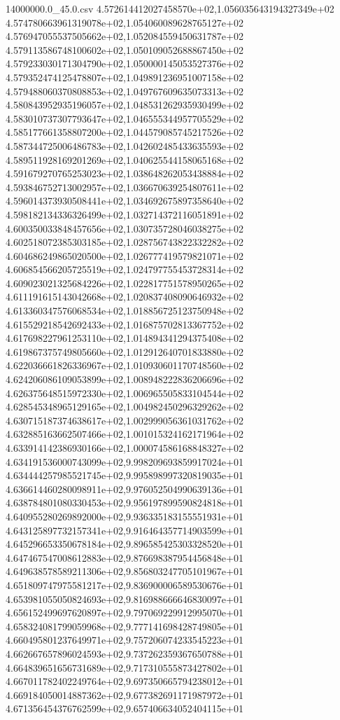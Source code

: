 \begin{filecontents*}{14000000.0_45.0.csv}
4.572614412027458570e+02,1.056035643194327349e+02
4.574780663961319078e+02,1.054060089628765127e+02
4.576947055537505662e+02,1.052084559450631787e+02
4.579113586748100602e+02,1.050109052688867450e+02
4.579233030171304790e+02,1.050000145053527376e+02
4.579352474125478807e+02,1.049891236951007158e+02
4.579488060370808853e+02,1.049767609635073313e+02
4.580843952935196057e+02,1.048531262935930499e+02
4.583010737307793647e+02,1.046555344957705529e+02
4.585177661358807200e+02,1.044579085745217526e+02
4.587344725006486783e+02,1.042602485433635593e+02
4.589511928169201269e+02,1.040625544158065168e+02
4.591679270765253023e+02,1.038648262053438884e+02
4.593846752713002957e+02,1.036670639254807611e+02
4.596014373930508441e+02,1.034692675897358640e+02
4.598182134336326499e+02,1.032714372116051891e+02
4.600350033848457656e+02,1.030735728046038275e+02
4.602518072385303185e+02,1.028756743822332282e+02
4.604686249865020500e+02,1.026777419579821071e+02
4.606854566205725519e+02,1.024797755453728314e+02
4.609023021325684226e+02,1.022817751578950265e+02
4.611191615143042668e+02,1.020837408090646932e+02
4.613360347576068534e+02,1.018856725123750948e+02
4.615529218542692433e+02,1.016875702813367752e+02
4.617698227961253110e+02,1.014894341294375408e+02
4.619867375749805660e+02,1.012912640701833880e+02
4.622036661826336967e+02,1.010930601170748560e+02
4.624206086109053899e+02,1.008948222836206696e+02
4.626375648515972330e+02,1.006965505833104544e+02
4.628545348965129165e+02,1.004982450296329262e+02
4.630715187374638617e+02,1.002999056361031762e+02
4.632885163662507466e+02,1.001015324162171964e+02
4.633914142386930166e+02,1.000074586168848327e+02
4.634191536000743099e+02,9.998209693859917024e+01
4.634444257985521745e+02,9.995898997320819035e+01
4.636614460280098911e+02,9.976052504990639136e+01
4.638784801080330453e+02,9.956197899590824818e+01
4.640955280269892000e+02,9.936335183155551931e+01
4.643125897732157341e+02,9.916464357714903599e+01
4.645296653350678184e+02,9.896585425303328520e+01
4.647467547008612883e+02,9.876698387954456848e+01
4.649638578589211306e+02,9.856803247705101967e+01
4.651809747975581217e+02,9.836900006589530676e+01
4.653981055050824693e+02,9.816988666646830097e+01
4.656152499697620897e+02,9.797069229912995070e+01
4.658324081799059968e+02,9.777141698428749805e+01
4.660495801237649971e+02,9.757206074233545223e+01
4.662667657896024593e+02,9.737262359367650788e+01
4.664839651656731689e+02,9.717310555873427802e+01
4.667011782402249764e+02,9.697350665794238012e+01
4.669184050014887362e+02,9.677382691171987972e+01
4.671356454376762599e+02,9.657406634052404115e+01

\end{filecontents*}
